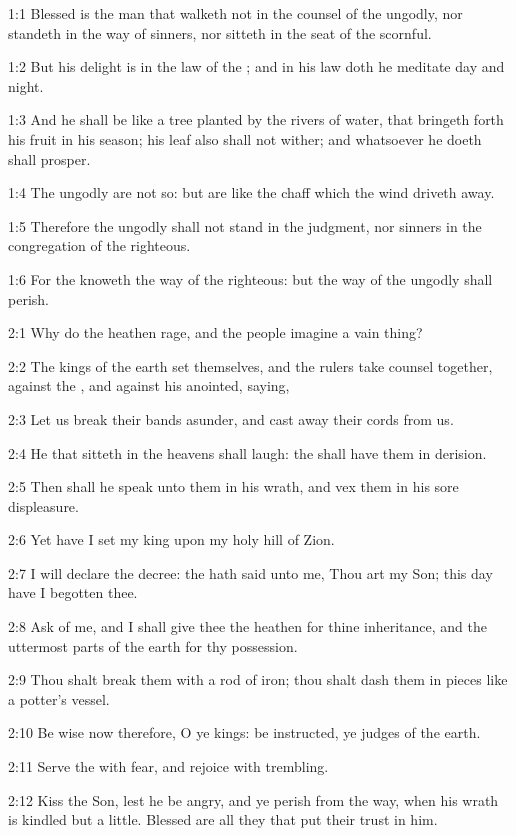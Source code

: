 

1:1 Blessed is the man that walketh not in the counsel of the ungodly,
nor standeth in the way of sinners, nor sitteth in the seat of the
scornful.

1:2 But his delight is in the law of the \LORD; and in his law doth he
meditate day and night.

1:3 And he shall be like a tree planted by the rivers of water, that
bringeth forth his fruit in his season; his leaf also shall not
wither; and whatsoever he doeth shall prosper.

1:4 The ungodly are not so: but are like the chaff which the wind
driveth away.

1:5 Therefore the ungodly shall not stand in the judgment, nor sinners
in the congregation of the righteous.

1:6 For the \LORD knoweth the way of the righteous: but the way of the
ungodly shall perish.



2:1 Why do the heathen rage, and the people imagine a vain thing?

2:2 The kings of the earth set themselves, and the rulers take counsel
together, against the \LORD, and against his anointed, saying,

2:3 Let us break their bands asunder, and cast away their cords from
us.

2:4 He that sitteth in the heavens shall laugh: the \LORD shall have
them in derision.

2:5 Then shall he speak unto them in his wrath, and vex them in his
sore displeasure.

2:6 Yet have I set my king upon my holy hill of Zion.

2:7 I will declare the decree: the \LORD hath said unto me, Thou art my
Son; this day have I begotten thee.

2:8 Ask of me, and I shall give thee the heathen for thine
inheritance, and the uttermost parts of the earth for thy possession.

2:9 Thou shalt break them with a rod of iron; thou shalt dash them in
pieces like a potter's vessel.

2:10 Be wise now therefore, O ye kings: be instructed, ye judges of
the earth.

2:11 Serve the \LORD with fear, and rejoice with trembling.

2:12 Kiss the Son, lest he be angry, and ye perish from the way, when
his wrath is kindled but a little. Blessed are all they that put their
trust in him.



